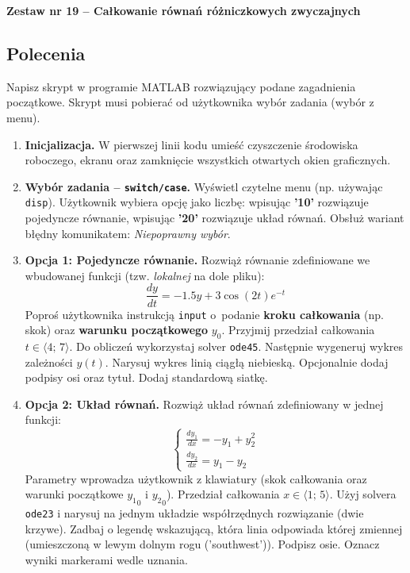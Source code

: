 \documentclass[a4paper,11pt]{article}
\begin{document}
\clearpage
\begin{center}
  {\large\bfseries Zestaw nr 19 \quad -- \quad Całkowanie równań różniczkowych zwyczajnych}
\end{center}
\hrulefill
\vspace{0.4cm}

\subsection*{Polecenia}

Napisz skrypt w programie MATLAB rozwiązujący podane zagadnienia początkowe. Skrypt musi pobierać od użytkownika wybór zadania (wybór z menu).

\begin{enumerate}[leftmargin=*, label=\textbf{\arabic*.}, itemsep=2pt]

  \item \textbf{Inicjalizacja.}
    W pierwszej linii kodu umieść czyszczenie środowiska roboczego, ekranu oraz zamknięcie wszystkich otwartych okien graficznych.

  \item \textbf{Wybór zadania -- \texttt{switch/case}.}
    Wyświetl czytelne menu (np. używając \texttt{disp}). Użytkownik wybiera opcję jako liczbę: wpisując \textbf{'10'} rozwiązuje pojedyncze równanie, wpisując \textbf{'20'} rozwiązuje układ równań. Obsłuż wariant błędny komunikatem: \textit{Niepoprawny wybór}.

  \item \textbf{Opcja 1: Pojedyncze równanie.}
    Rozwiąż równanie zdefiniowane we wbudowanej funkcji (tzw. \textit{lokalnej} na dole pliku):
    \[ \frac{dy}{dt} = -1.5y + 3\cos(2t)e^{-t} \]
    Poproś użytkownika instrukcją \texttt{input} o~podanie \textbf{kroku całkowania} (np. skok) oraz \textbf{warunku początkowego} $y_0$. Przyjmij przedział całkowania $t \in \langle 4;\,7 \rangle$.
    Do obliczeń wykorzystaj solver \texttt{ode45}. Następnie wygeneruj wykres zależności $y(t)$. Narysuj wykres linią ciągłą niebieską. Opcjonalnie dodaj podpisy osi oraz tytuł. Dodaj standardową siatkę.

  \item \textbf{Opcja 2: Układ równań.}
    Rozwiąż układ równań zdefiniowany w jednej funkcji:\\[-0.5em]
    \[
    \begin{cases}
      \frac{dy_1}{dx} = -y_1 + y_2^2 \\
      \frac{dy_2}{dx} = y_1 - y_2
    \end{cases}
    \]
    Parametry wprowadza użytkownik z klawiatury (skok całkowania oraz warunki początkowe $ {y_1}_{0} $ i $ {y_2}_{0} $). Przedział całkowania $x \in \langle 1;\,5 \rangle$.
    Użyj solvera \texttt{ode23} i narysuj na jednym układzie współrzędnych rozwiązanie (dwie krzywe). Zadbaj o legendę wskazującą, która linia odpowiada której zmiennej (umieszczoną w lewym dolnym rogu ('southwest')). Podpisz osie. Oznacz wyniki markerami wedle uznania.

\end{enumerate}
\end{document}
